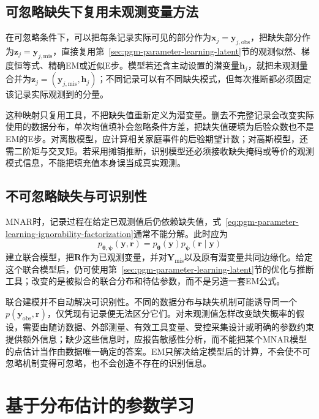 \subsection{可忽略缺失下复用未观测变量方法}
\label{sec:pgm-parameter-learning-ignorable-methods}

在可忽略条件下，可以把每条记录实际可见的部分作为$\bm{x}_j=\bm{y}_{j,\mathrm{obs}}$，把缺失部分作为$\bm{z}_j=\bm{y}_{j,\mathrm{mis}}$，直接复用第~\ref{sec:pgm-parameter-learning-latent}节的观测似然、梯度恒等式、精确EM或近似E步。模型若还含主动设置的潜变量$\bm{h}_j$，就把未观测量合并为$\bm{z}_j=(\bm{y}_{j,\mathrm{mis}},\bm{h}_j)$；不同记录可以有不同缺失模式，但每次推断都必须固定该记录实际观测到的分量。

这种映射只复用工具，不把缺失值重新定义为潜变量。删去不完整记录会改变实际使用的数据分布，单次均值填补会忽略条件方差，把缺失值硬填为后验众数也不是EM的E步。对离散模型，应计算相关家庭事件的后验期望计数；对高斯模型，还需二阶矩与交叉矩。若采用摊销推断，识别模型还必须接收缺失掩码或等价的观测模式信息，不能把填充值本身误当成真实观测。

\subsection{不可忽略缺失与可识别性}
\label{sec:pgm-parameter-learning-mnar}

MNAR时，记录过程在给定已观测值后仍依赖缺失值，式~\eqref{eq:pgm-parameter-learning-ignorability-factorization}通常不能分解。此时应为
\[
  p_{\bm{\theta},\bm{\psi}}(\bm{y},\bm{r})
  =p_{\bm{\theta}}(\bm{y})
   p_{\bm{\psi}}(\bm{r}\mid\bm{y})
\]
建立联合模型，把$\bm{R}$作为已观测变量，并对$\bm{Y}_{\mathrm{mis}}$以及原有潜变量共同边缘化。给定这个联合模型后，仍可使用第~\ref{sec:pgm-parameter-learning-latent}节的优化与推断工具；改变的是被拟合的联合分布和待估参数，而不是另造一套EM公式。

联合建模并不自动解决可识别性。不同的数据分布与缺失机制可能诱导同一个$p(\bm{y}_{\mathrm{obs}},\bm{r})$，仅凭现有记录便无法区分它们。对未观测值怎样改变缺失概率的假设，需要由随访数据、外部测量、有效工具变量、受控采集设计或明确的参数约束提供额外信息；缺少这些信息时，应报告敏感性分析，而不能把某个MNAR模型的点估计当作由数据唯一确定的答案。EM只解决给定模型后的计算，不会使不可忽略机制变得可忽略，也不会创造不存在的识别信息。

\section{基于分布估计的参数学习}
\label{sec:pgm-parameter-learning-bayesian}

